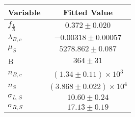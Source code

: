 \begin{tabular}[t]{lc}
\hline
Variable &Fitted Value\\
\hline\hline
$f_{\frac{L}{R}}$&$0.372\pm0.020$\\
\hline
$\lambda_{B,c}$&$-0.00318\pm0.00057$\\
\hline
$\mu_S$&$5278.862\pm0.087$\\
\hline
B&$364\pm31$\\
\hline
$n_{B,c}$&$(1.34\pm0.11)\times 10^3$\\
\hline
$n_S$&$(3.868\pm0.022)\times 10^4$\\
\hline
$\sigma_{L, S}$&$10.60\pm0.24$\\
\hline
$\sigma_{R, S}$&$17.13\pm0.19$\\
\hline
\end{tabular}